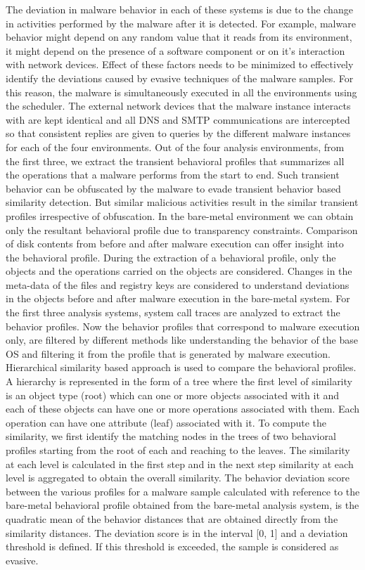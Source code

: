 \documentclass[11pt]{article}
\begin{document}
		The deviation in malware behavior in each of these systems is due to the change in activities performed by the malware after it is detected. For example, malware behavior might depend on any random value that it reads from its environment, it might depend on the presence of a software component or on it’s interaction with network devices. Effect of these factors needs to be minimized to effectively identify the deviations caused by evasive techniques of the malware samples. For this reason, the malware is simultaneously executed in all the environments using the scheduler. The external network devices that the malware instance interacts with are kept identical and all DNS and SMTP communications are intercepted so that consistent replies are given to queries by the different malware instances for each of the four environments. Out of the four analysis environments, from the first three, we extract the transient behavioral profiles that summarizes all the operations that a malware performs from the start to end. Such transient behavior can be obfuscated by the malware to evade transient behavior based similarity detection. But similar malicious activities result in the similar transient profiles irrespective of obfuscation. In the bare-metal environment we can obtain only the resultant behavioral profile due to transparency constraints. Comparison of disk contents from before and after malware execution can offer insight into the behavioral profile. During the extraction of a behavioral profile, only the objects and the operations carried on the objects are considered.
		Changes in the meta-data of the files and registry keys are considered to understand deviations in the objects before and after malware execution in the bare-metal system. For the first three analysis systems, system call traces are analyzed to extract the behavior profiles. Now the behavior profiles that correspond to malware execution only, are filtered by different methods like understanding the behavior of the base OS and filtering it from the profile that is generated by malware execution. Hierarchical similarity based approach is used to compare the behavioral profiles. A hierarchy is represented in the form of a tree where the first level of similarity is an object type (root) which can one or more objects associated with it and each of these objects can have one or more operations associated with them. Each operation can have one attribute (leaf) associated with it. To compute the similarity, we first identify the matching nodes in the trees of two behavioral profiles starting from the root of each and reaching to the leaves. The similarity at each level is calculated in the first step and in the next step similarity at each level is aggregated to obtain the overall similarity. The behavior deviation score between the various profiles for a malware sample calculated with reference to the bare-metal behavioral profile obtained from the bare-metal analysis system, is the quadratic mean of the behavior distances that are obtained directly from the similarity distances. The deviation score is in the interval [0, 1] and a deviation threshold is defined. If this threshold is exceeded, the sample is considered as evasive.  
\end{document}
